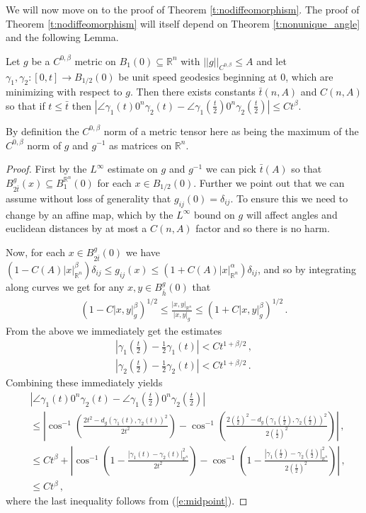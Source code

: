 \documentclass[11pt]{article}
\newcommand{\RR}{\mathds{R}}
\begin{document}
We will now move on to the proof of Theorem \ref{t:nodiffeomorphism}.  The proof of Theorem \ref{t:nodiffeomorphism} will itself depend on Theorem \ref{t:nonunique_angle} and the following Lemma.

\begin{lemma}\label{l:angle_estimate}
Let $g$ be a $C^{0,\beta}$ metric on $B_1(0)\subseteq \RR^n$ with $||g||_{C^{0,\beta}}\leq A$ and let $\gamma_1,\gamma_2:[0,t]\rightarrow B_{1/2}(0)$ be unit speed geodesics beginning at $0$, which are minimizing with respect to $g$.  Then there exists constants $\bar t(n,A)$ and $C(n,A)$ so that if $t\leq\bar t$ then $|\angle\gamma_1(t)0^n\gamma_2(t)-\angle\gamma_1(\frac{t}{2})0^n\gamma_2(\frac{t}{2})|\leq Ct^{\beta}$.
\end{lemma}
\begin{remark}
By definition the $C^{0,\beta}$ norm of a metric tensor here as being the maximum of the $C^{0,\beta}$ norm of $g$ and $g^{-1}$ as matrices on $\RR^n$.
\end{remark}
\begin{proof}
First by the $L^{\infty}$ estimate on $g$ and $g^{-1}$ we can pick $\bar t(A)$ so that $B^g_{2\bar t}(x)\subseteq B^{\RR^n}_1(0)$ for each $x\in B_{1/2}(0)$.  Further we point out that we can assume without loss of generality that $g_{ij}(0)=\delta_{ij}$.  To ensure this we need to change by an affine map, which by the $L^\infty$ bound on $g$ will affect angles and euclidean distances by at most a $C(n,A)$ factor and so there is no harm.

Now, for each $x\in B^g_{2\bar t}(0)$ we have $(1-C(A)|x|^\beta_{\RR^n})\delta_{ij}\leq g_{ij}(x)\leq (1+C(A)|x|^\alpha_{\RR^n})\delta_{ij}$, and so by integrating along curves we get for any $x,y\in B^g_{\bar h}(0)$ that
\begin{align}
(1-C|x,y|_g^\beta)^{1/2}\leq \frac{|x,y|_{\RR^n}}{|x,y|_g} \leq (1+C|x,y|_g^\beta)^{1/2}\, .
\end{align}
From the above we immediately get the estimates
\begin{align}\label{e:midpoint}
 |\gamma_1(\frac{t}{2})-\frac{1}{2}\gamma_1(t)|<Ct^{1+\beta/2}\, ,\\
 |\gamma_2(\frac{t}{2})-\frac{1}{2}\gamma_2(t)|<Ct^{1+\beta/2}\, .
\end{align}
Combining these immediately yields
\begin{align}
&|\angle\gamma_1(t)0^n\gamma_2(t)-\angle\gamma_1(\frac{t}{2})0^n\gamma_2(\frac{t}{2})|\, \\ &\leq |\cos^{-1}\left(\frac{2t^2 -d_g(\gamma_1(t),\gamma_2(t))^2}{2t^2}\right)- \cos^{-1}\left(\frac{2(\frac{t}{2})^2 -d_g(\gamma_1(\frac{t}{2}),\gamma_2(\frac{t}{2}))^2}{2(\frac{t}{2})^2}\right)|\, ,\\
&\leq Ct^{\beta}+|\cos^{-1}\left(1-\frac{|\gamma_1(t)-\gamma_2(t)|_{\RR^n}^2}{2t^2}\right) -\cos^{-1}\left(1-\frac{|\gamma_1(\frac{t}{2})-\gamma_2(\frac{t}{2})|_{\RR^n}^2}{2(\frac{t}{2})^2}\right)|\, ,\\
&\leq Ct^{\beta}\, ,
\end{align}
where the last inequality follows from (\ref{e:midpoint}).
\end{proof}
\end{document}
